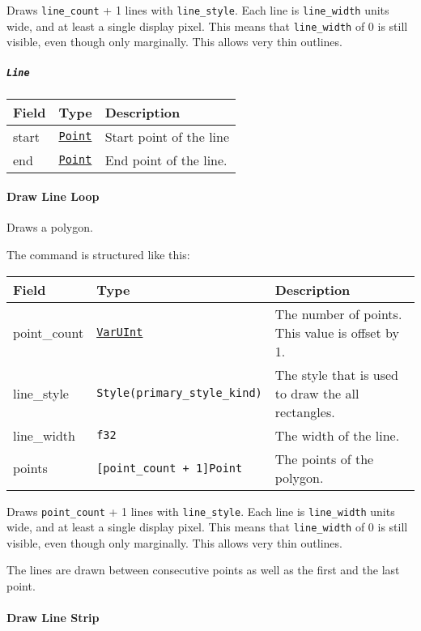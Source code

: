 \documentclass[]{article}
\begin{document}
Draws \texttt{line\_count} + 1 lines with \texttt{line\_style}. Each
line is \texttt{line\_width} units wide, and at least a single display
pixel. This means that \texttt{line\_width} of 0 is still visible, even
though only marginally. This allows very thin outlines.

\hypertarget{line}{%
\subparagraph{\texorpdfstring{\texttt{Line}}{Line}}\label{line}}

\begin{longtable}[]{@{}lll@{}}
\toprule
Field & Type & Description \\
\midrule
\endhead
start & \protect\hyperlink{point}{\texttt{Point}} & Start point of the
line \\
end & \protect\hyperlink{point}{\texttt{Point}} & End point of the
line. \\
\bottomrule
\end{longtable}

\hypertarget{draw-line-loop}{%
\paragraph{Draw Line Loop}\label{draw-line-loop}}

Draws a polygon.

The command is structured like this:

\begin{longtable}[]{@{}lll@{}}
\toprule
Field & Type & Description \\
\midrule
\endhead
point\_count & \protect\hyperlink{varuint}{\texttt{VarUInt}} & The
number of points. This value is offset by 1. \\
line\_style & \texttt{Style(primary\_style\_kind)} & The style that is
used to draw the all rectangles. \\
line\_width & \texttt{f32} & The width of the line. \\
points & \texttt{{[}point\_count\ +\ 1{]}Point} & The points of the
polygon. \\
\bottomrule
\end{longtable}

Draws \texttt{point\_count} + 1 lines with \texttt{line\_style}. Each
line is \texttt{line\_width} units wide, and at least a single display
pixel. This means that \texttt{line\_width} of 0 is still visible, even
though only marginally. This allows very thin outlines.

The lines are drawn between consecutive points as well as the first and
the last point.

\hypertarget{draw-line-strip}{%
\paragraph{Draw Line Strip}\label{draw-line-strip}}
\end{document}
